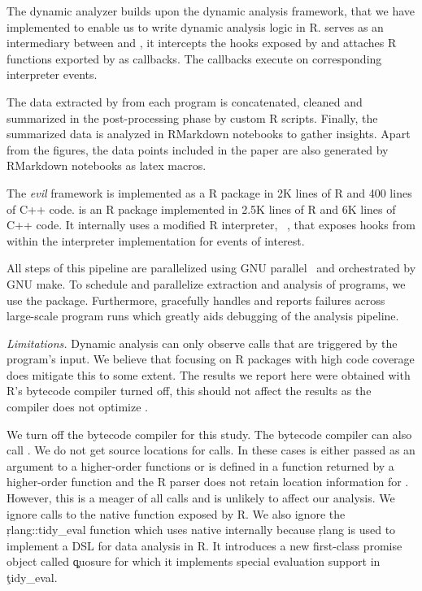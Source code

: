 \documentclass[USenglish,cleveref, autoref, thm-restate]{lipics-v2019}
\newcommand{\mypara}[1]{\medskip\noindent\emph{#1}\xspace}
\begin{document}
The dynamic analyzer builds upon the dynamic analysis framework,
\instrumentr that we have implemented to enable us to write dynamic
analysis logic in R. \instrumentr serves as an intermediary between
\rdyntrace and \evil, it intercepts the hooks exposed by \rdyntrace
and attaches R functions exported by \evil as callbacks. The \evil
callbacks execute on corresponding interpreter events.


The data extracted by \evil from each program is
concatenated, cleaned and summarized in the post-processing phase by
custom R scripts. Finally, the summarized data is analyzed in
RMarkdown notebooks to gather insights. Apart from the figures, the
data points included in the paper are also generated by RMarkdown
notebooks as latex macros.


The \emph{evil} framework is implemented as a R package in 2K lines of
R and 400 lines of C++ code. \instrumentr is an R package implemented
in 2.5K lines of R and 6K lines of C++ code. It internally uses a
modified R interpreter, \rdyntrace~\cite{oopsla19a}, that exposes
hooks from within the interpreter implementation for events of
interest.

All steps of this pipeline are parallelized using GNU
parallel~\cite{GNUparallel} and orchestrated by GNU make. To schedule
and parallelize extraction and analysis of programs, we use the \runr
package. Furthermore, \runr gracefully handles and reports failures
across large-scale program runs which greatly aids debugging of the
analysis pipeline.



\mypara{Limitations.} Dynamic analysis can only observe
calls that are triggered by the program's input. We believe that
focusing on R packages with high code coverage does mitigate this to
some extent. The results we report here were obtained with R's
bytecode compiler turned off, this should not affect the results as
the compiler does not optimize \eval.


We turn off the bytecode compiler for this study. The bytecode
compiler can also call \eval. We do not get source locations for
\UndefinedEvalsRnd \eval calls. In these cases \eval is either passed
as an argument to a higher-order functions or is defined in a function
returned by a higher-order function and the R parser does not retain
location information for \eval. However, this is a meager
\PercentUndefinedEval of all \eval calls and is unlikely to affect our
analysis. We ignore calls to the native \eval function exposed by R.
We also ignore the \c{rlang::tidy_eval} function which uses native
\eval internally because \c{rlang} is used to implement a DSL for data
analysis in R. It introduces a new first-class promise object called
\c{quosure} for which it implements special evaluation support in
\c{tidy_eval}.
\end{document}
